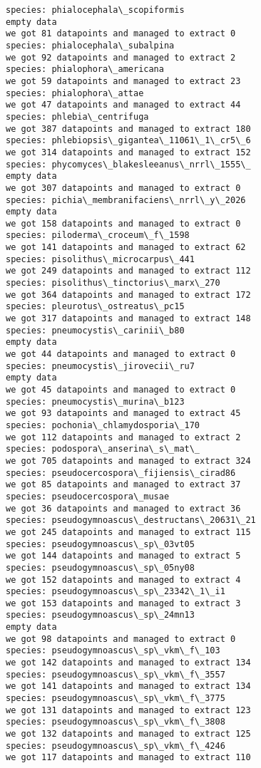 \documentclass[11pt]{article}
\begin{document}
\begin{Verbatim}[commandchars=\\\{\}]
species: phialocephala\_scopiformis
empty data
we got 81 datapoints and managed to extract 0
species: phialocephala\_subalpina
we got 92 datapoints and managed to extract 2
species: phialophora\_americana
we got 59 datapoints and managed to extract 23
species: phialophora\_attae
we got 47 datapoints and managed to extract 44
species: phlebia\_centrifuga
we got 387 datapoints and managed to extract 180
species: phlebiopsis\_gigantea\_11061\_1\_cr5\_6
we got 314 datapoints and managed to extract 152
species: phycomyces\_blakesleeanus\_nrrl\_1555\_
empty data
we got 307 datapoints and managed to extract 0
species: pichia\_membranifaciens\_nrrl\_y\_2026
empty data
we got 158 datapoints and managed to extract 0
species: piloderma\_croceum\_f\_1598
we got 141 datapoints and managed to extract 62
species: pisolithus\_microcarpus\_441
we got 249 datapoints and managed to extract 112
species: pisolithus\_tinctorius\_marx\_270
we got 364 datapoints and managed to extract 172
species: pleurotus\_ostreatus\_pc15
we got 317 datapoints and managed to extract 148
species: pneumocystis\_carinii\_b80
empty data
we got 44 datapoints and managed to extract 0
species: pneumocystis\_jirovecii\_ru7
empty data
we got 45 datapoints and managed to extract 0
species: pneumocystis\_murina\_b123
we got 93 datapoints and managed to extract 45
species: pochonia\_chlamydosporia\_170
we got 112 datapoints and managed to extract 2
species: podospora\_anserina\_s\_mat\_
we got 705 datapoints and managed to extract 324
species: pseudocercospora\_fijiensis\_cirad86
we got 85 datapoints and managed to extract 37
species: pseudocercospora\_musae
we got 36 datapoints and managed to extract 36
species: pseudogymnoascus\_destructans\_20631\_21
we got 245 datapoints and managed to extract 115
species: pseudogymnoascus\_sp\_03vt05
we got 144 datapoints and managed to extract 5
species: pseudogymnoascus\_sp\_05ny08
we got 152 datapoints and managed to extract 4
species: pseudogymnoascus\_sp\_23342\_1\_i1
we got 153 datapoints and managed to extract 3
species: pseudogymnoascus\_sp\_24mn13
empty data
we got 98 datapoints and managed to extract 0
species: pseudogymnoascus\_sp\_vkm\_f\_103
we got 142 datapoints and managed to extract 134
species: pseudogymnoascus\_sp\_vkm\_f\_3557
we got 141 datapoints and managed to extract 134
species: pseudogymnoascus\_sp\_vkm\_f\_3775
we got 131 datapoints and managed to extract 123
species: pseudogymnoascus\_sp\_vkm\_f\_3808
we got 132 datapoints and managed to extract 125
species: pseudogymnoascus\_sp\_vkm\_f\_4246
we got 117 datapoints and managed to extract 110

\end{Verbatim}
\end{document}
